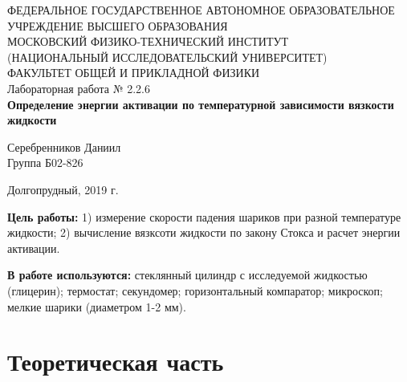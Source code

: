 \documentclass[a4paper,12pt]{article} %
\begin{document}
\begin{center}
\footnotesize{ФЕДЕРАЛЬНОЕ ГОСУДАРСТВЕННОЕ АВТОНОМНОЕ ОБРАЗОВАТЕЛЬНОЕ 			УЧРЕЖДЕНИЕ ВЫСШЕГО ОБРАЗОВАНИЯ}\\
\footnotesize{МОСКОВСКИЙ ФИЗИКО-ТЕХНИЧЕСКИЙ ИНСТИТУТ\\(НАЦИОНАЛЬНЫЙ 			ИССЛЕДОВАТЕЛЬСКИЙ УНИВЕРСИТЕТ)}\\
\footnotesize{ФАКУЛЬТЕТ ОБЩЕЙ И ПРИКЛАДНОЙ ФИЗИКИ\\}
\hfill \break
\hfill\break
\hfill\break
\hfill \break
\hfill \break
\hfill \break
\hfill \break
\hfill \break
\hfill \break
\hfill \break
\hfill \break
\hfill \break
\hfill \break
\hfill \break
\large{Лабораторная работа № 2.2.6\\\textbf{Определение энергии активации по температурной зависимости вязкости жидкости}}\\
\hfill \break
\hfill \break
\hfill \break
\begin{flushright}
	Серебренников Даниил\\
	Группа Б02-826
\end{flushright}
\hfill \break
\hfill \break
\hfill \break
\hfill \break
\hfill \break
\end{center}
\hfill \break
\hfill \break
\hfill \break
\hfill \break
\hfill \break
\hfill \break
\begin{center}
	Долгопрудный, 2019 г.
\end{center}
\thispagestyle{empty} %


\newpage
	\textbf{Цель работы:} 1) измерение скорости падения шариков при разной температуре жидкости; 2) вычисление вязксоти жидкости по закону Стокса и расчет энергии активации.
	
	\textbf{В работе используются:} стеклянный цилиндр с исследуемой жидкостью (глицерин); термостат; секундомер; горизонтальный компаратор; микроскоп; мелкие шарики (диаметром 1-2 мм).
	
\section{Теоретическая часть}
\end{document}
